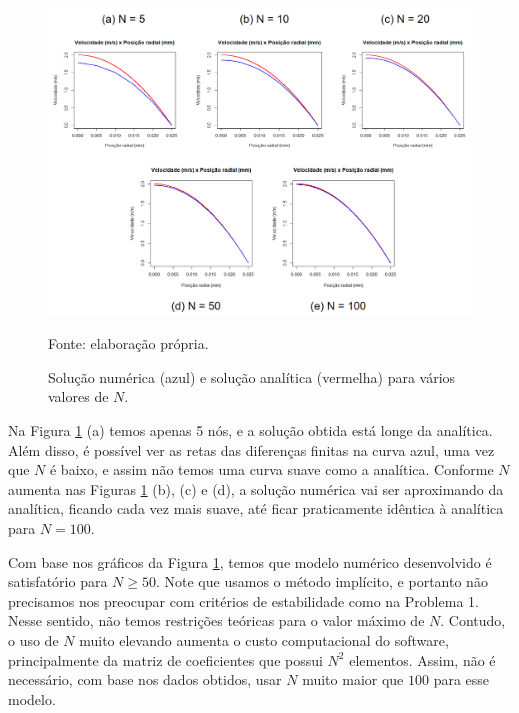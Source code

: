 \begin{figure}[h!]
    \caption{Solução numérica (azul) e solução analítica (vermelha) para vários valores de $N$.}
    \label{fig:graficoNumericoQ2}
    \centering
    \centerline{\includegraphics[scale=0.5]{graficoNumericoQ2.png}}
    \par{Fonte: elaboração própria.}
\end{figure}

Na Figura \ref*{fig:graficoNumericoQ2} (a) temos apenas 5 nós, e a solução obtida está longe da analítica.
Além disso, é possível ver as retas das diferenças finitas na curva azul, uma vez que $N$ é baixo, e 
assim não temos uma curva suave como a analítica. Conforme $N$ aumenta nas Figuras \ref*{fig:graficoNumericoQ2} (b),
(c) e (d), a solução numérica vai ser aproximando da analítica, ficando cada vez mais suave, até ficar
praticamente idêntica à analítica para $N = 100$.

Com base nos gráficos da Figura \ref*{fig:graficoNumericoQ2}, temos que modelo numérico desenvolvido é
satisfatório para $N \geq 50$. Note que usamos o método implícito, e portanto não precisamos nos preocupar com
critérios de estabilidade como na Problema 1. Nesse sentido, não temos restrições teóricas para o valor máximo
de $N$.
Contudo, o uso de $N$ muito elevando aumenta o custo computacional do software, principalmente da matriz de 
coeficientes que possui $N^2$ elementos. Assim, não é necessário, com base nos dados obtidos, 
usar $N$ muito maior que $100$ para esse modelo.